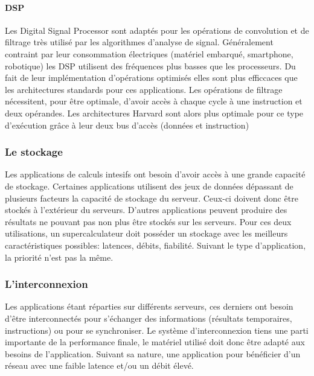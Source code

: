         \paragraph{DSP} Les Digital Signal Processor sont adaptés pour les opérations de convolution et de filtrage très utilisé par les algorithmes d'analyse de signal. Généralement contraint par leur consommation électriques (matériel embarqué, smartphone, robotique) les DSP utilisent des fréquences plus basses que les processeurs. Du fait de leur implémentation d'opérations optimisés elles sont plus efficcaces que les architectures standards pour ces applications. Les opérations de filtrage nécessitent, pour être optimale, d'avoir accès à chaque cycle à une instruction et deux opérandes. Les architectures Harvard sont alors plus optimale pour ce type d'exécution grâce à leur deux bus d'accès (données et instruction)

    
    \subsubsection{Le stockage}
         Les applications de calculs intesifs ont besoin d'avoir accès à une grande capacité de stockage. Certaines applications utilisent des jeux de données dépassant de plusieurs facteurs la capacité de stockage du serveur. Ceux-ci doivent donc être stockés à l'extérieur du serveurs. D'autres applications peuvent produire des résultats ne pouvant pas non plus être stockés sur les serveurs. Pour ces deux utilisations, un supercalculateur doit posséder un stockage avec les meilleurs caractéristiques possibles: latences, débits, fiabilité. Suivant le type d'application, la priorité n'est pas la même.
    
    
    \subsubsection{L'interconnexion }\label{sec:edl_interco}
    
        Les applications étant réparties sur différents serveurs, ces derniers ont besoin d'être interconnectés pour s'échanger des informations (résultats temporaires, instructions) ou pour se synchroniser. Le système d'interconnexion tiens une parti importante de la performance finale, le matériel utilisé doit donc être adapté aux besoins de l'application. Suivant sa nature, une application pour bénéficier d'un réseau avec une faible latence et/ou un débit élevé. 
        
